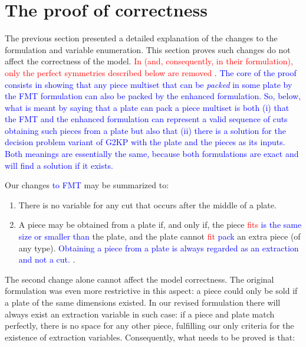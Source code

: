 \documentclass[ppgc,tese,english,formais,babel]{iiufrgs}
\newif\iffinalversion
\newcommand{\newtext}[1]{\iffinalversion%
#1%
\else%
\textcolor{blue}{#1}%
\fi%
}
\newcommand{\oldtext}[1]{\iffinalversion%
\else%
\textcolor{red}{#1}%
\fi%
}
\begin{document}

\section{The proof of correctness}
\label{sec:proof_of_correctness}

The previous section presented a detailed explanation of the changes to the formulation and variable enumeration.
This section proves such changes do not affect the correctness of the model.
\oldtext{In \citet{furini:2016} (and, consequently, in their formulation), only the perfect symmetries described below are removed}.
\newtext{The core of the proof consists in showing that any piece multiset that can be \emph{packed} in some plate by the FMT formulation can also be packed by the enhanced formulation. So, below, what is meant by saying that a plate can pack a piece multiset is both (i) that the FMT and the enhanced formulation can represent a valid sequence of cuts obtaining such pieces from a plate but also that (ii) there is a solution for the decision problem variant of G2KP with the plate and the pieces as its inputs. Both meanings are essentially the same, because both formulations are exact and will find a solution if it exists.}
Our changes \newtext{to FMT} may be summarized to:

\begin{enumerate}
\item There is no variable for any cut that occurs after the middle of a plate.
\item A piece may be obtained from a plate if, and only if, the piece \oldtext{fits}\newtext{is the same size or smaller than} the plate, and the plate cannot \oldtext{fit}\newtext{pack} an extra piece (of any type). \newtext{Obtaining a piece from a plate is always regarded as an extraction and not a cut.}.
\end{enumerate}

The second change alone cannot affect the model correctness.
The original formulation was even more restrictive in this aspect:
a piece could only be sold if a plate of the same dimensions existed.
In our revised formulation there will always exist an extraction variable in such case:
if a piece and plate match perfectly, there is no space for any other piece, fulfilling our only criteria for the existence of extraction variables.
Consequently, what needs to be proved is that:
\end{document}
